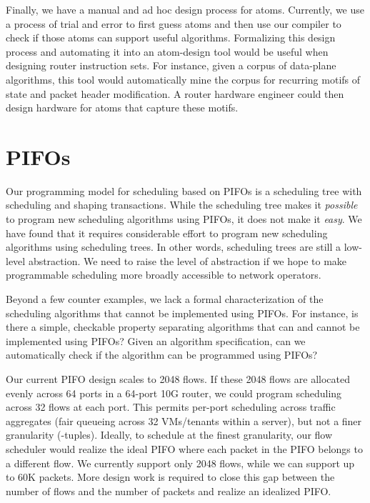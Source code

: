 Finally, we have a manual and ad hoc design process for atoms. Currently, we
use a process of trial and error to first guess atoms and then use our compiler
to check if those atoms can support useful algorithms.  Formalizing this design
process and automating it into an atom-design tool would be useful when
designing router instruction sets. For instance, given a corpus of data-plane
algorithms, this tool would automatically mine the corpus for recurring motifs
of state and packet header modification. A router hardware engineer could then
design hardware for atoms that capture these motifs.

\section{PIFOs}
\label{sec:pifo_limitations}

Our programming model for scheduling based on PIFOs is a scheduling tree with
scheduling and shaping transactions. While the scheduling tree makes it
\textit{possible} to program new scheduling algorithms using PIFOs, it does not
make it \textit{easy}. We have found that it requires considerable effort to
program new scheduling algorithms using scheduling trees.  In other words,
scheduling trees are still a low-level abstraction. We need to raise the level
of abstraction if we hope to make programmable scheduling more broadly
accessible to network operators.

Beyond a few counter examples, we lack a formal characterization of the
scheduling algorithms that cannot be implemented using PIFOs. For instance, is
there a simple, checkable property separating algorithms that can and cannot be
implemented using PIFOs? Given an algorithm specification, can we automatically
check if the algorithm can be programmed using PIFOs?

Our current PIFO design scales to 2048 flows. If these 2048 flows are allocated
evenly across 64 ports in a 64-port 10G router, we could program scheduling
across 32 flows at each port. This permits per-port scheduling across traffic
aggregates (\eg fair queueing across 32 VMs/tenants within a server), but not
a finer granularity (-tuples). Ideally, to schedule at the finest
granularity, our flow scheduler would realize the ideal PIFO where each packet
in the PIFO belongs to a different flow. We currently support only 2048 flows,
while we can support up to 60K packets.  More design work is required to close
this gap between the number of flows and the number of packets and realize an
idealized PIFO.

